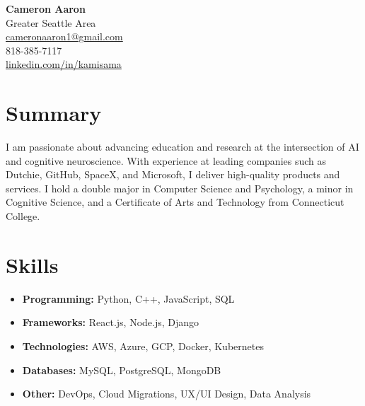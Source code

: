 \documentclass[a4paper,10pt]{article}
\begin{document}
\begin{center}
    \textbf{\huge Cameron Aaron} \\
    Greater Seattle Area \\
    \href{mailto:cameronaaron1@gmail.com}{cameronaaron1@gmail.com} \\
    818-385-7117 \\
    \href{https://linkedin.com/in/kamisama}{linkedin.com/in/kamisama}
\end{center}

\section*{Summary}
\color{text}
I am passionate about advancing education and research at the intersection of AI and cognitive neuroscience. With experience at leading companies such as Dutchie, GitHub, SpaceX, and Microsoft, I deliver high-quality products and services. I hold a double major in Computer Science and Psychology, a minor in Cognitive Science, and a Certificate of Arts and Technology from Connecticut College.

\section*{Skills}
\begin{itemize}[leftmargin=0cm, itemsep=0pt, label={}]
    \item \textbf{Programming:} Python, C++, JavaScript, SQL
    \item \textbf{Frameworks:} React.js, Node.js, Django
    \item \textbf{Technologies:} AWS, Azure, GCP, Docker, Kubernetes
    \item \textbf{Databases:} MySQL, PostgreSQL, MongoDB
    \item \textbf{Other:} DevOps, Cloud Migrations, UX/UI Design, Data Analysis
\end{itemize}
\end{document}
